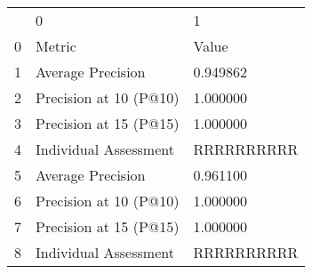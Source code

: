 \begin{tabular}{lll}
 & 0 & 1 \\
0 & Metric & Value \\
1 & Average Precision & 0.949862 \\
2 & Precision at 10 (P@10) & 1.000000 \\
3 & Precision at 15 (P@15) & 1.000000 \\
4 & Individual Assessment & RRRRRRRRRR \\
5 & Average Precision & 0.961100 \\
6 & Precision at 10 (P@10) & 1.000000 \\
7 & Precision at 15 (P@15) & 1.000000 \\
8 & Individual Assessment & RRRRRRRRRR \\
\end{tabular}
